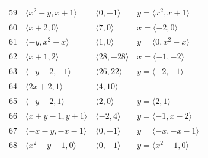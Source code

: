 \documentclass[11pt]{article}
\begin{document}
\begin{longtable}{@{}rlll@{}}
59 & $\langle x^{2}-y,x+1\rangle$ & $\langle 0,-1\rangle$ & $y=\langle x^{2},x+1\rangle$\\
60 & $\langle x+2,0\rangle$ & $\langle 7,0\rangle$ & $x=\langle -2,0\rangle$\\
61 & $\langle -y,x^{2}-x\rangle$ & $\langle 1,0\rangle$ & $y=\langle 0,x^{2}-x\rangle$\\
62 & $\langle x+1,2\rangle$ & $\langle 28,-28\rangle$ & $x=\langle -1,-2\rangle$\\
63 & $\langle -y-2,-1\rangle$ & $\langle 26,22\rangle$ & $y=\langle -2,-1\rangle$\\
64 & $\langle 2x+2,1\rangle$ & $\langle 4,10\rangle$ & --\\
65 & $\langle -y+2,1\rangle$ & $\langle 2,0\rangle$ & $y=\langle 2,1\rangle$\\
66 & $\langle x+y-1,y+1\rangle$ & $\langle -2,4\rangle$ & $y=\langle -1,x-2\rangle$\\
67 & $\langle -x-y,-x-1\rangle$ & $\langle 0,-1\rangle$ & $y=\langle -x,-x-1\rangle$\\
68 & $\langle x^{2}-y-1,0\rangle$ & $\langle 0,-1\rangle$ & $y=\langle x^{2}-1,0\rangle$\\
\end{longtable}
\endgroup
\end{document}
